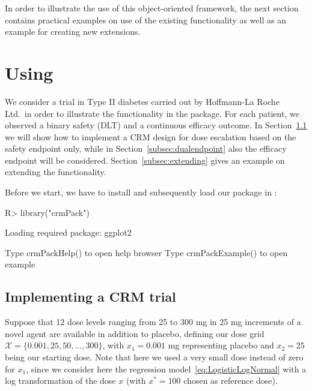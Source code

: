 \documentclass[article]{jss}\usepackage[]{graphicx}\usepackage[]{color}
\begin{document}
In order to illustrate the use of this object-oriented framework, the next
section contains practical examples on use of the existing functionality as well
as an example for creating new extensions.

\section[Using crmPack]{Using }\label{sec:using}

We consider a trial in Type II diabetes carried out by Hoffmann-La Roche Ltd.\
in order to illustrate the functionality in the package.
For each patient, we observed a binary safety (DLT) and a continuous efficacy outcome.
In Section~\ref{subsec:crmtrial} we will show how to implement a CRM design for
dose escalation based on the safety endpoint only, while in
Section~\ref{subsec:dualendpoint} also the efficacy endpoint will be considered.
Section~\ref{subsec:extending} gives an example on extending the \pkg{crmPack}
functionality.

Before we start, we have to install and subsequently load our package in :
\begin{Schunk}
\begin{Sinput}
R> library("crmPack")
\end{Sinput}
\begin{Soutput}
Loading required package: ggplot2
\end{Soutput}
\begin{Soutput}
Type crmPackHelp() to open help browser
Type crmPackExample() to open example
\end{Soutput}
\end{Schunk}

\subsection{Implementing a CRM trial}
\label{subsec:crmtrial}

Suppose that 12 dose levels ranging from 25 to 300 mg in 25 mg increments of a
novel agent are available in addition to placebo, defining our dose grid 
$\mathcal{X} = \{0.001,25, 50,\dotsc, 300\}$, with $x_{1} = 0.001$ mg representing 
placebo and  $x_{2} = 25$ being our starting dose. Note that here we used a very small dose instead of zero 
for $x_{1}$, since we consider here the regression model~\eqref{eq:LogisticLogNormal}
with a log transformation of the dose $x$ (with $x^{*} = 100$ chosen as reference dose). 
\end{document}
